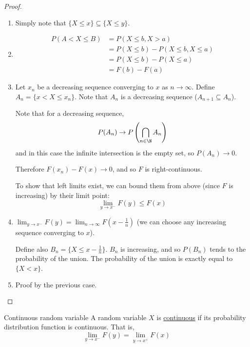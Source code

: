 \documentclass[../Main.tex]{subfiles}
\begin{document}
\begin{proof}
    \begin{enumerate}
        \item Simply note that $\{X \leq x\} \subseteq \{X \leq y\}$.
        \item \begin{align*}
            P(A < X \leq B) &= P(X \leq b, X > a) \\
            &= P(X \leq b) - P(X \leq b, X \leq a) \\
            &= P(X \leq b) - P(X \leq a) \\
            &= F(b) - F(a)
        \end{align*}
        \item Let $x_n$ be a decreasing sequence converging to $x$ as $n \to \infty$.
            Define $A_n = \{x < X \leq x_n\}$. Note that $A_n$ is a decreasing sequence ($A_{n + 1} \subseteq A_n$).\par
            Note that for a decreasing sequence,
            \begin{equation*}
                P(A_n) \to P\left(\bigcap_{n \in \N} A_n\right)
            \end{equation*}
            and in this case the infinite intersection is the empty set, so $P(A_n) \to 0$.\par
            Therefore $F(x_n) - F(x) \to 0$, and so $F$ is right-continuous.\par
            To show that left limits exist, we can bound them from above (since $F$ is increasing) by their limit point:
            \begin{equation*}
                \lim_{y \to x^-} F(y) \leq F(x)
            \end{equation*}
        \item $\lim_{y \to x^-} F(y) = \lim_{n \to \infty} F(x - \frac{1}{n})$ (we can choose any increasing sequence converging to $x$).\par
            Define also $B_n = \{X \leq x - \frac{1}{n}\}$. $B_n$ is increasing, and so $P(B_n)$ tends to the probability of the union. The probability of the union is exactly equal to $\{X < x\}$.
        \item Proof by the previous case.
    \end{enumerate}
\end{proof}
\begin{definition}{Continuous random variable}
    A random variable $X$ is \underline{continuous} if its probability distribution function is continuous. That is,
    \begin{equation*}
        \lim_{y \to x^-} F(y) = \lim_{y \to x^+} F(x)
    \end{equation*}
\end{definition}
\end{document}
